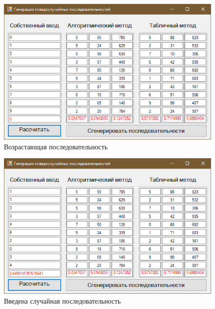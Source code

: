 \begin{figure}[h]
	\includegraphics[width=1\linewidth]{inc/img/4.png}
	\caption{Возрастающая последовательность}
	\label{p4}
\end{figure}

\begin{figure}[h]
\includegraphics[width=1\linewidth]{inc/img/3.png}
\caption{Введена случайная последовательность}
\label{p3}
\end{figure}
